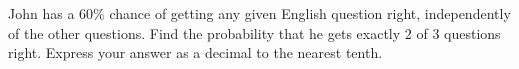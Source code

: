 John has a $60\%$ chance of getting any given English question right, independently of the other questions. Find the probability that he gets exactly $2$ of $3$ questions right. Express your answer as a decimal to the nearest tenth.

